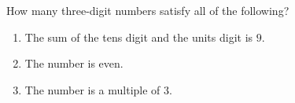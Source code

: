 How many three-digit numbers satisfy all of the following?
\begin{enumerate}
\item[(1)] The sum of the tens digit and the units digit is $9$.
\item[(2)] The number is even.
\item[(3)] The number is a multiple of $3$.
\end{enumerate}
